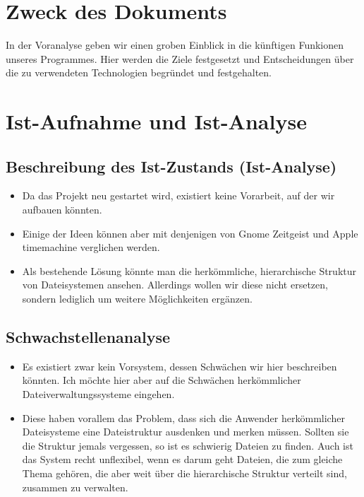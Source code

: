 \documentclass[10pt,paper=a4,final]{scrartcl}
\begin{document}
\section{Zweck des Dokuments}
In der Voranalyse geben wir einen groben Einblick in die künftigen Funkionen unseres Programmes. Hier werden die Ziele festgesetzt und Entscheidungen \"uber die zu verwendeten Technologien begründet und festgehalten.
\section{Ist-Aufnahme und Ist-Analyse}
\subsection{Beschreibung des Ist-Zustands (Ist-Analyse)}
\begin{itemize}
  \item Da das Projekt neu gestartet wird, existiert keine Vorarbeit, auf der wir aufbauen könnten.
  \item Einige der Ideen können aber mit denjenigen von Gnome Zeitgeist\cite{activity_journal} und Apple timemachine\cite{timemachine} verglichen werden.
  \item Als bestehende Lösung könnte man die herkömmliche, hierarchische Struktur von Dateisystemen ansehen. Allerdings wollen wir diese nicht ersetzen, sondern lediglich um weitere Möglichkeiten ergänzen.
\end{itemize}
\subsection{Schwachstellenanalyse}
\begin{itemize}
  \item Es existiert zwar kein Vorsystem, dessen Schwächen wir hier beschreiben könnten. Ich möchte hier aber auf die Schwächen herkömmlicher Dateiverwaltungssysteme eingehen.
  \item Diese haben vorallem das Problem, dass sich die Anwender herkömmlicher Dateisysteme eine Dateistruktur ausdenken und merken müssen. Sollten sie die Struktur jemals vergessen, so ist es schwierig Dateien zu finden. Auch ist das System recht unflexibel, wenn es darum geht Dateien, die zum gleiche Thema gehören, die aber weit über die hierarchische Struktur verteilt sind, zusammen zu verwalten.
\end{itemize}
\end{document}
